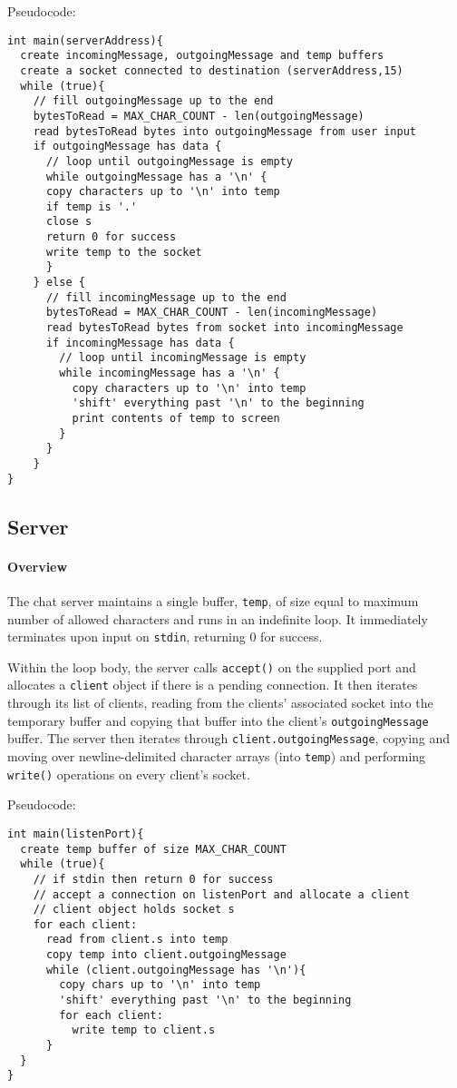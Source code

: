 \documentclass[]{article}
\begin{document}
\noindent Pseudocode:

\begin{lstlisting}
int main(serverAddress){
  create incomingMessage, outgoingMessage and temp buffers
  create a socket connected to destination (serverAddress,15)
  while (true){
    // fill outgoingMessage up to the end
    bytesToRead = MAX_CHAR_COUNT - len(outgoingMessage)
	read bytesToRead bytes into outgoingMessage from user input
	if outgoingMessage has data {
	  // loop until outgoingMessage is empty
  	  while outgoingMessage has a '\n' {
	  copy characters up to '\n' into temp
	  if temp is '.'
  	  close s
	  return 0 for success
	  write temp to the socket
	  }
	} else {
	  // fill incomingMessage up to the end
	  bytesToRead = MAX_CHAR_COUNT - len(incomingMessage)
	  read bytesToRead bytes from socket into incomingMessage
	  if incomingMessage has data {
	    // loop until incomingMessage is empty
	    while incomingMessage has a '\n' {
	      copy characters up to '\n' into temp
	      'shift' everything past '\n' to the beginning
	      print contents of temp to screen
	    }
	  }
	} 	
}
\end{lstlisting}
\subsection{Server}
\paragraph{Overview}
The chat server maintains a single buffer, \texttt{temp}, of size equal to maximum number of allowed characters and runs in an indefinite loop. It immediately terminates upon input on \texttt{stdin}, returning 0 for success.

Within the loop body, the server calls \texttt{accept()} on the supplied port and allocates a \texttt{client} object if there is a pending connection. It then iterates through its list of clients, reading from the clients' associated socket into the temporary buffer and copying that buffer into the client's \texttt{outgoingMessage} buffer. The server then iterates through \texttt{client.outgoingMessage}, copying and moving over newline-delimited character arrays (into \texttt{temp}) and performing \texttt{write()} operations on every client's socket.

\pagebreak

\noindent Pseudocode:

\begin{lstlisting}
int main(listenPort){
  create temp buffer of size MAX_CHAR_COUNT
  while (true){
    // if stdin then return 0 for success
    // accept a connection on listenPort and allocate a client
    // client object holds socket s
    for each client:
      read from client.s into temp
      copy temp into client.outgoingMessage
      while (client.outgoingMessage has '\n'){
        copy chars up to '\n' into temp
        'shift' everything past '\n' to the beginning
        for each client:
          write temp to client.s
      }
  }
}	
\end{lstlisting}
\end{document}
